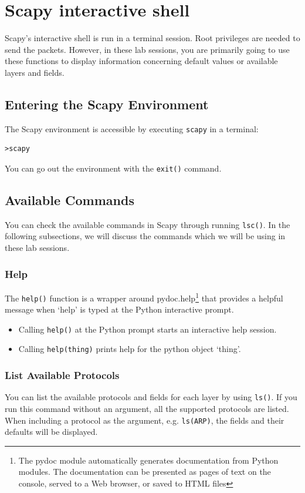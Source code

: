 \documentclass[11pt,a4paper]{article}
\begin{document}
\clearpage
\appendix
\section{Scapy interactive shell}\label{sec:scapy-interactive}

Scapy's interactive shell is run in a terminal session. Root privileges are needed to send the packets. However, in these lab sessions, you are primarily going to use these functions to display information concerning default values or available layers and fields.

\subsection{Entering the Scapy Environment}

The Scapy environment is accessible by executing \texttt{scapy} in a terminal:
%
\begin{lstlisting}
>scapy 
\end{lstlisting}
%
You can go out the environment with the \texttt{exit()} command.

\subsection{Available Commands}
You can check the available commands in Scapy through running \texttt{lsc()}. In the following subsections, we will discuss the commands which we will be using in these lab sessions.

\subsubsection{Help}
The \texttt{help()} function is a wrapper around pydoc.help\footnote{The pydoc module automatically generates documentation from Python modules. The documentation can be presented as pages of text on the console, served to a Web browser, or saved to HTML files} that provides a helpful message when `help' is typed at the Python interactive prompt.

\begin{itemize}
  \item Calling \texttt{help()} at the Python prompt starts an interactive help session.
  \item Calling \texttt{help(thing)} prints help for the python object `thing'.
\end{itemize}

\subsubsection{List Available Protocols}
You can list the available protocols and fields for each layer by using \texttt{ls()}. 
If you run this command without an argument, all the supported protocols are listed.
When including a protocol as the argument, e.g. \texttt{ls(ARP)}, the fields and their defaults will be displayed.

\end{document}
